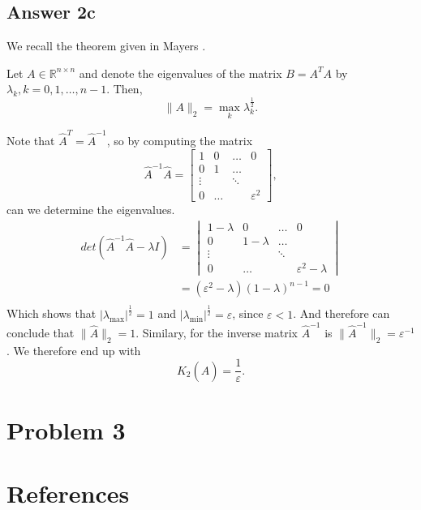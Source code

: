 \documentclass{article}
\theoremstyle{remark}
\begin{document}
\subsection{Answer 2c}%
\label{sub:answer_c}
 We recall the theorem given in Mayers \cite{sul}. 
\begin{theorem}
  Let $ A \in  \mathbb{R} ^{n \times n }$ and denote the eigenvalues of the matrix $B = A^{T} A$ by $\lambda _{k}, k = 0,1,\ldots,n-1$. Then, \[
    \|A\|_{2}^{} = \max_{k }  \lambda _{k} ^{\frac{1}{2}}.
  \] 
\end{theorem}
Note that $\hat{A}^{T} = \hat{A}^{-1}$, so by computing the matrix \[
\hat{A}^{-1} \hat{A} = \begin{bmatrix} 
1  & 0  &  \ldots  &  0 \\
0   &  1  &  \ldots  \\
\vdots   &   &  \ddots   &  \\
0  &  \ldots  &   &   \varepsilon ^{2} 
\end{bmatrix} ,
\] 
 can we determine the eigenvalues.\[
   \begin{split}
det \left(  \hat{A}^{-1} \hat{A} - \lambda I \right)  &= 
\begin{vmatrix} 
1- \lambda   & 0  &  \ldots  &  0 \\
0   &  1 - \lambda   &  \ldots  \\
\vdots   &   &  \ddots   &  \\
0  &  \ldots  &   &   \varepsilon ^2  - \lambda  
\end{vmatrix}  \\
   &=  \left( \varepsilon ^2 - \lambda  \right) \left( 1- \lambda  \right)^{n-1} = 0 \\
   \end{split}  
 \] 
 Which shows that $\left\lvert \lambda_{\text{max}}  \right\rvert^{\frac{1}{2}}   = 1  $ and $\left\lvert \lambda_{\text{min}}  \right\rvert^{\frac{1}{2}}   = \varepsilon   $, since $\varepsilon   < 1$. And therefore can conclude that $\|\hat{A}\|_{2}^{} = 1 $. Similary, for the inverse matrix $\hat{A}^{-1}$ is $\|\hat{A}^{-1}\|_{2}^{} = \varepsilon ^{-1} $. 
 We therefore end up with \[
 K_{2}\left( \hat{A} \right) = \frac{1}{\varepsilon } .
 \] 

 \newpage
 \section{Problem 3}%
 \label{sec:problem_3}
 
 

\newpage

\section{References}%
\label{sec:references}


\end{document}
